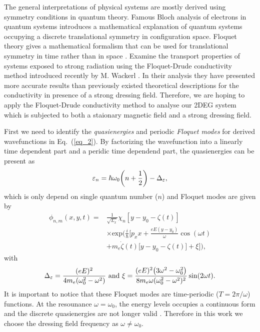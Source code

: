 
The general interpretations of physical systems are mostly derived using symmetry conditions in quantum theory. Famous Bloch analysis of electrons in quantum systems introduces a mathematical explanation of quantum systems occupying a discrete translational symmetry in configuration space. Floquet theory gives a mathematical formalism that can be used for translational symmetry in time rather than in space \cite{floquet83,grifoni98,holthaus15}. Examine the transport properties of systems exposed to strong radiation using the Floquet-Drude conductivity method introduced recently by M. Wackerl \cite{wackerl20}. In their analysis they have presented more accurate results than previously existed theoretical descriptions for the conductivity in presence of a strong dressing field. Therefore, we are hoping to apply the Floquet-Drude conductivity method to analyse our 2DEG system which is subjected to both a staionary magnetic field and a strong dressing field.

First we need to identify the \textit{quasienergies} and periodic \textit{Floquet modes} for derived wavefunctions in Eq.~(\ref{eq_2}). By factorizing the wavefunction into a linearly time dependent part and a peridic time dependend part, the quasienergies can be present as
\begin{equation} \label{eq_6}
  \varepsilon_{n} =
  \hbar \omega_0\qty(n + \frac{1}{2}) - \Delta_{\varepsilon},
\end{equation}
which is only depend on single quantum number ($n$) and Floquet modes are given by
\begin{equation} \label{eq_7}
  \begin{aligned}
    \phi_{n,m}(x,y,t) = &
    \frac{1}{\sqrt{L_x}} \chi_{n}\left[y - y_0 - \zeta(t)\right]\\
    & \times
    \text{exp}\bigg(
     \frac{i}{\hbar}\bigg[
     p_x x +
     \frac{eE(y - y_0)}{\omega}\cos(\omega t) \\
     & +
     m_e\dot{\zeta}(t)\big[y - y_0 -\zeta(t)\big]
     + \xi \bigg]\bigg),
  \end{aligned}
\end{equation}
with
\begin{equation} \label{eq_8}
  \Delta_{\varepsilon} = \frac{(eE)^2}{4m_e(\omega_0^2 - \omega^2)} ~ \text{and} ~
  \xi = \frac{(eE)^2\qty(3\omega^2 - \omega_0^2)}{8m_e\omega(\omega_0^2 - \omega^2)^2} \sin(2\omega t).
\end{equation}
It is important to notice that these Floquet modes are time-periodic ($T=2\pi/\omega$) functions. At the resounance $\omega = \omega_0$, the energy levels occupies a continuous form and the discrete quasienergies are not longer valid \cite{popov70}. Therefore in this work we choose the dressing field frequency as $\omega \neq \omega_0$.

